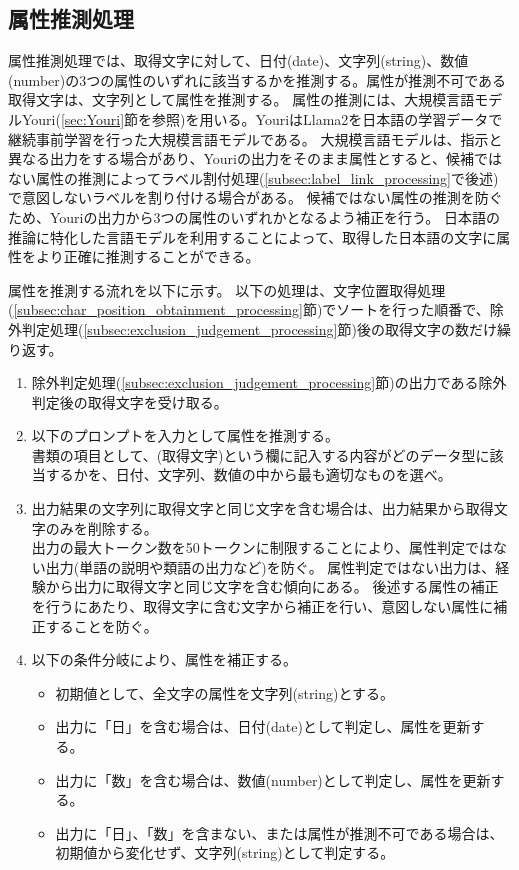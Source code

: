 \subsection{属性推測処理}\label{subsec:att_prediction_processing}
属性推測処理では、取得文字に対して、日付(date)、文字列(string)、数値(number)の3つの属性のいずれに該当するかを推測する。属性が推測不可である取得文字は、文字列として属性を推測する。
属性の推測には、大規模言語モデルYouri(\ref{sec:Youri}節を参照)を用いる。YouriはLlama2を日本語の学習データで継続事前学習を行った大規模言語モデルである。
大規模言語モデルは、指示と異なる出力をする場合があり、Youriの出力をそのまま属性とすると、候補ではない属性の推測によってラベル割付処理(\ref{subsec:label_link_processing}で後述)で意図しないラベルを割り付ける場合がある。
候補ではない属性の推測を防ぐため、Youriの出力から3つの属性のいずれかとなるよう補正を行う。
日本語の推論に特化した言語モデルを利用することによって、取得した日本語の文字に属性をより正確に推測することができる。

属性を推測する流れを以下に示す。
以下の処理は、文字位置取得処理(\ref{subsec:char_position_obtainment_processing}節)でソートを行った順番で、除外判定処理(\ref{subsec:exclusion_judgement_processing}節)後の取得文字の数だけ繰り返す。

\begin{enumerate}
    \item 除外判定処理(\ref{subsec:exclusion_judgement_processing}節)の出力である除外判定後の取得文字を受け取る。
    \item 以下のプロンプトを入力として属性を推測する。\\
        書類の項目として、(取得文字)という欄に記入する内容がどのデータ型に該当するかを、日付、文字列、数値の中から最も適切なものを選べ。
    \item 出力結果の文字列に取得文字と同じ文字を含む場合は、出力結果から取得文字のみを削除する。\\
        出力の最大トークン数を50トークンに制限することにより、属性判定ではない出力(単語の説明や類語の出力など)を防ぐ。
        属性判定ではない出力は、経験から出力に取得文字と同じ文字を含む傾向にある。
        後述する属性の補正を行うにあたり、取得文字に含む文字から補正を行い、意図しない属性に補正することを防ぐ。
    \item 以下の条件分岐により、属性を補正する。
        \begin{itemize}
            \item 初期値として、全文字の属性を文字列(string)とする。
            \item 出力に「日」を含む場合は、日付(date)として判定し、属性を更新する。
            \item 出力に「数」を含む場合は、数値(number)として判定し、属性を更新する。
            \item 出力に「日」、「数」を含まない、または属性が推測不可である場合は、初期値から変化せず、文字列(string)として判定する。
        \end{itemize}
\end{enumerate}



